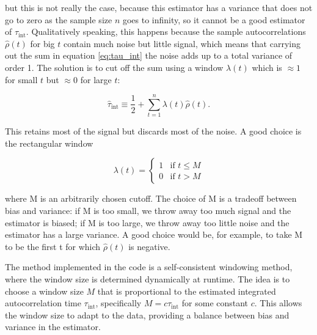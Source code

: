 but this is not really the case, because this estimator has a variance that does not go to zero as the sample size $n$ goes to infinity, so it cannot be a good estimator of $\tau_{\text{int}}$. Qualitatively speaking, this happens because the sample autocorrelations $\widehat{\rho}(t)$ for big $t$ contain much noise but little signal, which means that carrying out the sum in equation \eqref{eq:tau_int} the noise adds up to a total variance of order 1. The solution is to cut off the sum using a window $\lambda(t)$ which is $\approx 1$ for small $t$ but $\approx 0$ for large $t$:

\begin{equation}
    \label{eq:tau_int_windowed}
    \widehat{\tau}_{\text{int}} \equiv \frac{1}{2} + \sum_{t=1}^{n} \lambda(t) \widehat{\rho}(t).
\end{equation}

This retains most of the signal but discards most of the noise. A good choice is the rectangular window

\begin{equation}
    \lambda(t) = \begin{cases} 
    1 & \text{if } t \le M \\ 
    0 & \text{if } t > M
    \end{cases}
\end{equation}

where M is an arbitrarily chosen cutoff. The choice of M is a tradeoff between bias and variance: if M is too small, we throw away too much signal and the estimator is biased; if M is too large, we throw away too little noise and the estimator has a large variance. A good choice would be, for example, to take M to be the first t for which $\widehat{\rho}(t)$ is negative.

The method implemented in the code is a self-consistent windowing method, where the window size is determined dynamically at runtime. The idea is to choose a window size $M$ that is proportional to the estimated integrated autocorrelation time $\tau_{\text{int}}$, specifically $M = c \tau_{\text{int}}$ for some constant $c$. This allows the window size to adapt to the data, providing a balance between bias and variance in the estimator.

